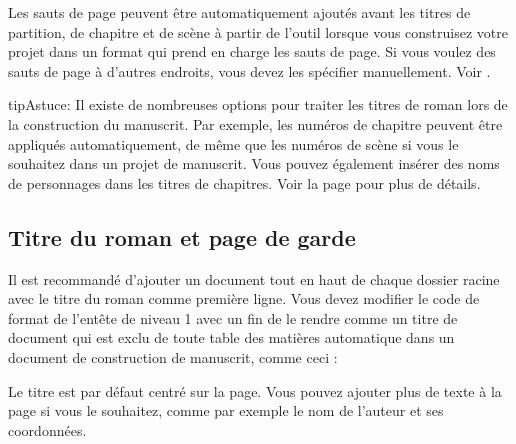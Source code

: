 \documentclass[a4paper,11pt,french]{sphinxmanual}
\begin{document}
\sphinxAtStartPar
Les sauts de page peuvent être automatiquement ajoutés avant les titres de partition, de chapitre et de scène à partir de l’outil  lorsque vous construisez votre projet dans un format qui prend en charge les sauts de page. Si vous voulez des sauts de page à d’autres endroits, vous devez les spécifier manuellement. Voir {\hyperref[\detokenize{usage_format:a-fmt-break}]{}}.

\begin{sphinxadmonition}{tip}{Astuce:}
\sphinxAtStartPar
Il existe de nombreuses options pour traiter les titres de roman lors de la construction du manuscrit. Par exemple, les numéros de chapitre peuvent être appliqués automatiquement, de même que les numéros de scène si vous le souhaitez dans un projet de manuscrit. Vous pouvez également insérer des noms de personnages dans les titres de chapitres. Voir la page {\hyperref[\detokenize{project_manuscript:a-manuscript}]{}} pour plus de détails.
\end{sphinxadmonition}


\subsection{Titre du roman et page de garde}
\label{\detokenize{project_structure:novel-title-and-front-matter}}\label{\detokenize{project_structure:a-struct-heads-title}}
\sphinxAtStartPar
Il est recommandé d’ajouter un document tout en haut de chaque dossier racine  avec le titre du roman comme première ligne. Vous devez modifier le code de format de l’en\sphinxhyphen{}tête de niveau 1 avec un \sphinxcode{\sphinxupquote{!}} fin de le rendre comme un titre de document qui est exclu de toute table des matières automatique dans un document de construction de manuscrit, comme ceci :

\begin{sphinxVerbatim}[commandchars=\\\{\}]

\PYGZgt{}\PYGZgt{}  \PYGZlt{}\PYGZlt{}
\end{sphinxVerbatim}

\sphinxAtStartPar
Le titre est par défaut centré sur la page. Vous pouvez ajouter plus de texte à la page si vous le souhaitez, comme par exemple le nom de l’auteur et ses coordonnées.
\end{document}
